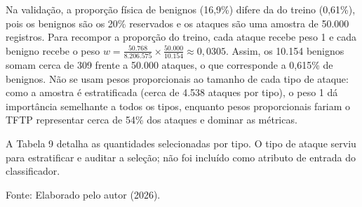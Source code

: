 \documentclass[
    12pt,                %
    openright,           %
    oneside,             %
    a4paper,             %
    english,             %
    brazil               %
]{abntex2}
\begin{document}
Na validação, a proporção física de benignos (16,9\%) difere da do treino (0,61\%), pois os benignos são os 20\% reservados e os ataques são uma amostra de 50.000 registros. Para recompor a proporção do treino, cada ataque recebe peso 1 e cada benigno recebe o peso $w = \frac{50.768}{8.206.575} \times \frac{50.000}{10.154} \approx 0{,}0305$. Assim, os 10.154 benignos somam cerca de 309 frente a 50.000 ataques, o que corresponde a 0,615\% de benignos. Não se usam pesos proporcionais ao tamanho de cada tipo de ataque: como a amostra é estratificada (cerca de 4.538 ataques por tipo), o peso 1 dá importância semelhante a todos os tipos, enquanto pesos proporcionais fariam o TFTP representar cerca de 54\% dos ataques e dominar as métricas.

A Tabela 9 detalha as quantidades selecionadas por tipo. O tipo de ataque serviu para estratificar e auditar a seleção; não foi incluído como atributo de entrada do classificador.

\begin{table}
\centering
\caption{Distribuição dos registros selecionados por classe e tipo de ataque}
\label{tab:distribuicao-registros-tipo-ataque}
\par\smallskip
Fonte: Elaborado pelo autor (2026).
\end{table}
\end{document}
